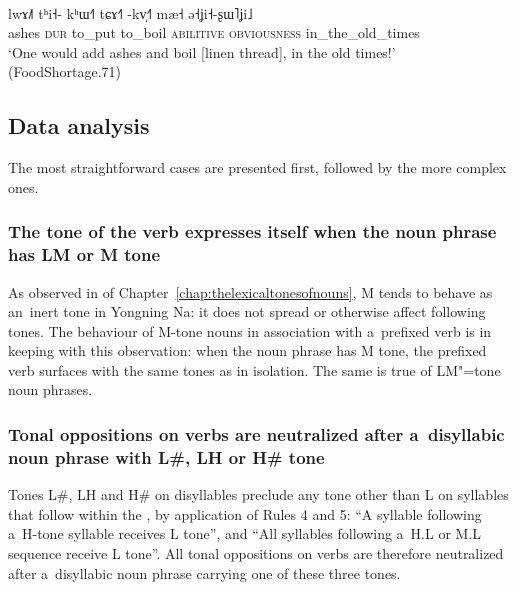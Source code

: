 \newpage 
\begin{exe}
	\ex
	\label{ex:putashes}
	\\
	\gll lwɤ˩˥		tʰi˧-			kʰɯ˧˥		tɕɤ˧˥		-kv̩˧˥					mæ˧							ə˧ʝi˧-ʂɯ˥ʝi˩\\
	ashes		\textsc{dur}	to\_put	 	to\_boil	\textsc{abilitive}	\textsc{obviousness}		in\_the\_old\_times\\
	\glt ‘One would add ashes and boil [linen thread], in the old times!’ (FoodShortage.71)
\end{exe}


\subsection{Data analysis}
\label{sec:dataanalysisobjectandprefixedverb}


The most straightforward cases are presented first, followed by the more complex ones.


\subsubsection{The tone of the verb expresses itself when the noun phrase has LM or M tone}
\label{sec:thetoneoftheverbexpressesitselfwhenthenounphrasehastonelmorm}


As observed in  of Chapter~\ref{chap:thelexicaltonesofnouns}, M tends to behave as an~inert tone in Yongning Na: it does not
spread or otherwise affect following tones. The behaviour of M-tone nouns in association with
a~prefixed verb is in keeping with this observation: when the noun phrase has M tone, the prefixed
verb surfaces with the same tones as in isolation. The same is true of LM"=tone noun phrases.


\subsubsection{Tonal oppositions on verbs are neutralized after a~disyllabic noun phrase with L\#, LH or H\# tone}
\label{sec:tonaloppositionsonverbsareneutralizedafteradisyllabicnounphrasewithtonellhandh}

Tones L\#, LH and H\# on disyllables preclude any tone other than L on syllables that follow within
the , by application of Rules 4 and 5: “A syllable following a~H-tone syllable receives L
tone”, and “All syllables following a~H.L or M.L sequence receive L tone”. All tonal oppositions on
verbs are therefore neutralized after a~disyllabic noun phrase carrying one of these three tones.


